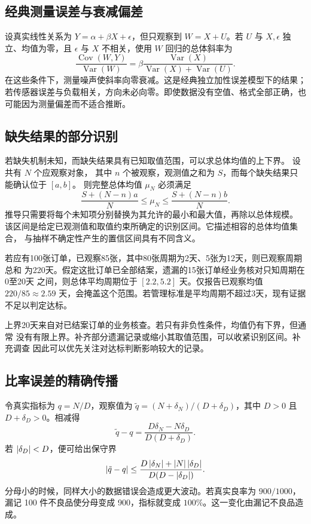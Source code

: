 \subsection{经典测量误差与衰减偏差}
设真实线性关系为 \(Y=\alpha+\beta X+\epsilon\)，但只观察到 \(W=X+U\)。若 \(U\) 与 \(X,\epsilon\) 独立、均值为零，且 \(\epsilon\) 与 \(X\) 不相关，使用 \(W\) 回归的总体斜率为
\[
\frac{\operatorname{Cov}(W,Y)}{\operatorname{Var}(W)}
=\beta\frac{\operatorname{Var}(X)}
{\operatorname{Var}(X)+\operatorname{Var}(U)}.
\]
在这些条件下，测量噪声使斜率向零衰减。这是经典独立加性误差模型下的结果；若传感器误差与负载相关，方向未必向零。即使数据没有空值、格式全部正确，也可能因为测量偏差而不适合推断。

\subsection{缺失结果的部分识别}
若缺失机制未知，而缺失结果具有已知取值范围，可以求总体均值的上下界。
设共有 \(N\) 个应观察对象，
其中 \(n\) 个被观察，观测值之和为 \(S\)，而每个缺失结果只能确认位于 \([a,b]\)。
则完整总体均值 \(\mu_N\) 必须满足
\begin{equation}
\frac{S+(N-n)a}{N}\le\mu_N\le
\frac{S+(N-n)b}{N}.
\label{eq:missing-bounds}
\end{equation}
推导只需要将每个未知项分别替换为其允许的最小和最大值，再除以总体规模。
该区间是给定已观测值和取值约束所确定的识别区间。它描述相容的总体均值集合，
与抽样不确定性产生的置信区间具有不同含义。

\begin{example}[不完整周期记录的解释]
若应有100张订单，已观察85张，其中80张周期为2天、5张为12天，则已观察周期总和
为220天。假定这批订单已全部结案，遗漏的15张订单经业务核对只知周期在0至20天
之间，则总体平均周期位于 \([2.2,5.2]\) 天。仅报告已观察均值 \(220/85\approx2.59\)
天，会掩盖这个范围。若管理标准是平均周期不超过3天，现有证据不足以判定达标。
\end{example}

上界20天来自对已结案订单的业务核查。若只有非负性条件，均值仍有下界，但通常
没有有限上界。补齐部分遗漏记录或缩小其取值范围，可以收紧识别区间。补充调查
因此可以优先关注对达标判断影响较大的记录。

\subsection{比率误差的精确传播}
令真实指标为 \(q=N/D\)，观察值为 \(\tilde q=(N+\delta_N)/(D+\delta_D)\)，其中 \(D>0\) 且 \(D+\delta_D>0\)。相减得
\[
\tilde q-q
=\frac{D\delta_N-N\delta_D}{D(D+\delta_D)}.
\]
若 \(\left\lvert \delta_D\right\rvert<D\)，便可给出保守界
\[
\left\lvert \tilde q-q\right\rvert
\le\frac{D\left\lvert \delta_N\right\rvert+\left\lvert N\right\rvert\left\lvert \delta_D\right\rvert}
{D(D-\left\lvert \delta_D\right\rvert)}.
\]
分母小的时候，同样大小的数据错误会造成更大波动。若真实良率为 \(900/1000\)，漏记 100 件不良品使分母变成 900，指标就变成 \(100\%\)。这一变化由漏记不良品造成。

